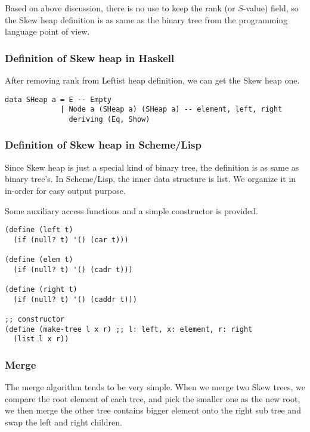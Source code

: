 \documentclass{article}
\begin{document}
Based on above discussion, there is no use to keep the rank (or $S$-value)
field, so the Skew heap definition is as same as the binary tree from the
programming language point of view.

\subsubsection*{Definition of Skew heap in Haskell}

After removing rank from Leftist heap definition, we can get the Skew
heap one.

\lstset{language=Haskell}
\begin{lstlisting}
data SHeap a = E -- Empty 
             | Node a (SHeap a) (SHeap a) -- element, left, right
               deriving (Eq, Show)
\end{lstlisting}

\subsubsection*{Definition of Skew heap in Scheme/Lisp}
\label{skew-heap-def-lisp}

Since Skew heap is just a special kind of binary tree, the definition is
as same as binary tree's. In Scheme/Lisp, the inner data structure is
list. We organize it in in-order for easy output purpose.

Some auxiliary access functions and a simple constructor is provided.

\lstset{language = lisp}
\begin{lstlisting}
(define (left t)
  (if (null? t) '() (car t)))

(define (elem t)
  (if (null? t) '() (cadr t)))

(define (right t)
  (if (null? t) '() (caddr t)))

;; constructor
(define (make-tree l x r) ;; l: left, x: element, r: right
  (list l x r))
\end{lstlisting}

\subsubsection{Merge}

The merge algorithm tends to be very simple. When we merge two Skew
trees, we compare the root element of each tree, and pick the smaller
one as the new root, we then merge the other tree contains bigger
element onto the right sub tree and swap the left and right children.
\end{document}
